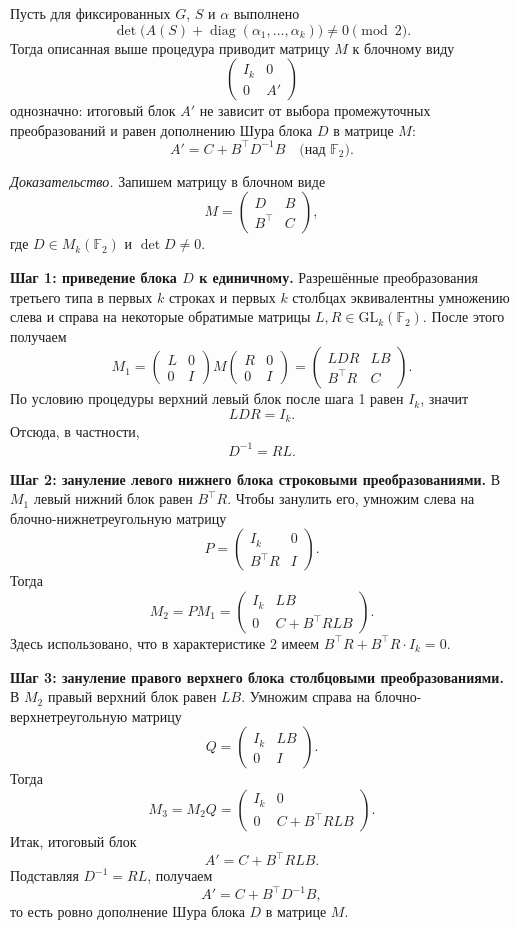 \documentclass[12pt,a4paper]{article}
\begin{document}
Пусть для фиксированных $G$, $S$ и $\alpha$ выполнено
\[
\det\bigl(A(S)+\operatorname{diag}(\alpha_1,\ldots,\alpha_k)\bigr)\neq 0 \pmod{2}.
\]
Тогда описанная выше процедура приводит матрицу $M$ к блочному виду
\[
\begin{pmatrix}
I_k & 0\\
0 & A'
\end{pmatrix}
\]
однозначно: итоговый блок $A'$ не зависит от выбора промежуточных преобразований и равен дополнению Шура блока $D$ в матрице $M$:
\[
A' = C + B^\top D^{-1}B
\quad \text{(над }\mathbb{F}_2\text{)}.
\]

\textit{Доказательство.}
Запишем матрицу в блочном виде
\[
M=\begin{pmatrix}
D & B\\
B^\top & C
\end{pmatrix},
\]
где $D\in M_k(\mathbb F_2)$ и $\det D\neq 0$.

\textbf{Шаг 1: приведение блока $D$ к единичному.}
Разрешённые преобразования третьего типа в первых $k$ строках и первых $k$ столбцах
эквивалентны умножению слева и справа на некоторые обратимые матрицы
$L,R\in \mathrm{GL}_k(\mathbb F_2)$.
После этого получаем
\[
M_1=
\begin{pmatrix}
L & 0\\
0 & I
\end{pmatrix}
M
\begin{pmatrix}
R & 0\\
0 & I
\end{pmatrix}
=
\begin{pmatrix}
LDR & LB\\
B^\top R & C
\end{pmatrix}.
\]
По условию процедуры верхний левый блок после шага 1 равен $I_k$, значит
\[
LDR=I_k.
\]
Отсюда, в частности,
\[
D^{-1}=RL.
\]

\textbf{Шаг 2: зануление левого нижнего блока строковыми преобразованиями.}
В $M_1$ левый нижний блок равен $B^\top R$.
Чтобы занулить его, умножим слева на блочно-нижнетреугольную матрицу
\[
P=
\begin{pmatrix}
I_k & 0\\
B^\top R & I
\end{pmatrix}.
\]
Тогда
\[
M_2=PM_1=
\begin{pmatrix}
I_k & LB\\
0 & C+B^\top RLB
\end{pmatrix}.
\]
Здесь использовано, что в характеристике $2$ имеем
$B^\top R + B^\top R\cdot I_k=0$.

\textbf{Шаг 3: зануление правого верхнего блока столбцовыми преобразованиями.}
В $M_2$ правый верхний блок равен $LB$.
Умножим справа на блочно-верхнетреугольную матрицу
\[
Q=
\begin{pmatrix}
I_k & LB\\
0 & I
\end{pmatrix}.
\]
Тогда
\[
M_3=M_2Q=
\begin{pmatrix}
I_k & 0\\
0 & C+B^\top RLB
\end{pmatrix}.
\]
Итак, итоговый блок
\[
A' = C+B^\top RLB.
\]
Подставляя $D^{-1}=RL$, получаем
\[
A' = C + B^\top D^{-1}B,
\]
то есть ровно дополнение Шура блока $D$ в матрице $M$.
\end{document}

